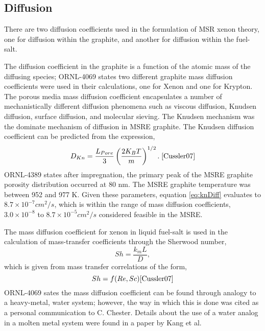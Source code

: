 \subsection{Diffusion}
There are two diffusion coefficients used in the formulation of MSR xenon theory, one for diffusion within the graphite, and another for diffusion within the fuel-salt. 

The diffusion coefficient in the graphite is a function of the atomic mass of the diffusing species; ORNL-4069 states two different graphite mass diffusion coefficients were used in their calculations, one for Xenon and one for Krypton. \cite[p. 65]{ORNL4069} The porous media mass diffusion coefficient  encapsulates a number of mechanistically different diffusion phenomena such as viscous diffusion, Knudsen diffusion, surface diffusion, and molecular sieving. \cite[p. 190]{Cussler07}  The Knudsen mechanism was the dominate mechanism of diffusion in MSRE graphite. \cite[p. 37]{ORNL4148}  The Knudsen diffusion coefficient can be predicted from the expression,
\begin{equation}
    \label{eq:knDiff}
    D_{Kn} = \frac{L_{Pore}}{3} \left( \frac{2K_B  T}{m} \right)^{1/2}.\;  \text{\cite[p.194]{Cussler07}}
\end{equation} 
ORNL-4389 states after impregnation, the primary peak of the MSRE graphite porosity distribution occurred at 80 nm. \cite[p. 12]{ORNL4389}  The MSRE graphite temperature was between 952 and 977 K. \cite[p. 56]{Robertson1971} Given these parameters, equation \ref{eq:knDiff} evaluates to $8.7\times10^{-7} cm^2/s$, which is within the range of mass diffusion coefficients,  $3.0\times10^{-8} $ to $8.7\times10^{-5} cm^2/s$ considered feasible in the MSRE. \cite[p. 54]{ORNLTM3464}

The mass diffusion coefficient for xenon in liquid fuel-salt is used in the calculation of mass-transfer coefficients through the Sherwood number,
\begin{equation}
    Sh = \frac{k_m L}{D},
\end{equation}
which is given from mass transfer correlations of the form,
\begin{equation}
    Sh = f(Re,Sc) \text{\cite[p. 257]{Cussler07}}
\end{equation}
ORNL-4069 sates the mass diffusion coefficient can be found through analogy to a heavy-metal, water system; however, the way in which this is done was cited as a personal communication to C. Chester. \cite[p p.62]{ORNL4069} Details about the use of a water analog in a molten metal system were found in a paper by Kang et al. \cite[p. 107]{Muruganant2017} 

